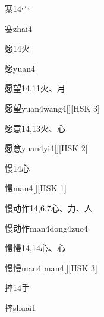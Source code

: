 \begin{entry}{寨}{14}{⼧}
  \begin{phonetics}{寨}{zhai4}
  \end{phonetics}
\end{entry}

\begin{entry}{愿}{14}{⽕}
  \begin{phonetics}{愿}{yuan4}
  \end{phonetics}
\end{entry}

\begin{entry}{愿望}{14,11}{⽕、⽉}
  \begin{phonetics}{愿望}{yuan4wang4}[][HSK 3]
  \end{phonetics}
\end{entry}

\begin{entry}{愿意}{14,13}{⽕、⼼}
  \begin{phonetics}{愿意}{yuan4yi4}[][HSK 2]
  \end{phonetics}
\end{entry}

\begin{entry}{慢}{14}{⼼}
  \begin{phonetics}{慢}{man4}[][HSK 1]
  \end{phonetics}
\end{entry}

\begin{entry}{慢动作}{14,6,7}{⼼、⼒、⼈}
  \begin{phonetics}{慢动作}{man4dong4zuo4}
  \end{phonetics}
\end{entry}

\begin{entry}{慢慢}{14,14}{⼼、⼼}
  \begin{phonetics}{慢慢}{man4 man4}[][HSK 3]
  \end{phonetics}
\end{entry}

\begin{entry}{摔}{14}{⼿}
  \begin{phonetics}{摔}{shuai1}
  \end{phonetics}
\end{entry}

